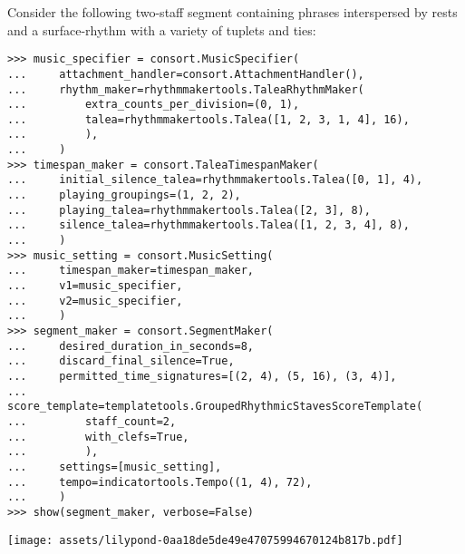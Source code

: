 Consider the following two-staff segment containing phrases interspersed by
rests and a surface-rhythm with a variety of tuplets and ties:

\begin{comment}
<abjad>[stylesheet=../consort.ily]
music_specifier = consort.MusicSpecifier(
    attachment_handler=consort.AttachmentHandler(),
    rhythm_maker=rhythmmakertools.TaleaRhythmMaker(
        extra_counts_per_division=(0, 1),
        talea=rhythmmakertools.Talea([1, 2, 3, 1, 4], 16),
        ),
    )
timespan_maker = consort.TaleaTimespanMaker(
    initial_silence_talea=rhythmmakertools.Talea([0, 1], 4),
    playing_groupings=(1, 2, 2),
    playing_talea=rhythmmakertools.Talea([2, 3], 8),
    silence_talea=rhythmmakertools.Talea([1, 2, 3, 4], 8),
    )
music_setting = consort.MusicSetting(
    timespan_maker=timespan_maker,
    v1=music_specifier,
    v2=music_specifier,
    )
segment_maker = consort.SegmentMaker(
    desired_duration_in_seconds=8,
    discard_final_silence=True,
    permitted_time_signatures=[(2, 4), (5, 16), (3, 4)],
    score_template=templatetools.GroupedRhythmicStavesScoreTemplate(
        staff_count=2,
        with_clefs=True,
        ),
    settings=[music_setting],
    tempo=indicatortools.Tempo((1, 4), 72),
    )
show(segment_maker, verbose=False)
</abjad>
\end{comment}

\begin{abjadbookoutput}
\begin{singlespacing}
\vspace{-0.5\baselineskip}
\begin{verbatim}
>>> music_specifier = consort.MusicSpecifier(
...     attachment_handler=consort.AttachmentHandler(),
...     rhythm_maker=rhythmmakertools.TaleaRhythmMaker(
...         extra_counts_per_division=(0, 1),
...         talea=rhythmmakertools.Talea([1, 2, 3, 1, 4], 16),
...         ),
...     )
>>> timespan_maker = consort.TaleaTimespanMaker(
...     initial_silence_talea=rhythmmakertools.Talea([0, 1], 4),
...     playing_groupings=(1, 2, 2),
...     playing_talea=rhythmmakertools.Talea([2, 3], 8),
...     silence_talea=rhythmmakertools.Talea([1, 2, 3, 4], 8),
...     )
>>> music_setting = consort.MusicSetting(
...     timespan_maker=timespan_maker,
...     v1=music_specifier,
...     v2=music_specifier,
...     )
>>> segment_maker = consort.SegmentMaker(
...     desired_duration_in_seconds=8,
...     discard_final_silence=True,
...     permitted_time_signatures=[(2, 4), (5, 16), (3, 4)],
...     score_template=templatetools.GroupedRhythmicStavesScoreTemplate(
...         staff_count=2,
...         with_clefs=True,
...         ),
...     settings=[music_setting],
...     tempo=indicatortools.Tempo((1, 4), 72),
...     )
>>> show(segment_maker, verbose=False)
\end{verbatim}
\noindent\texttt{[image: assets/lilypond-0aa18de5de49e47075994670124b817b.pdf]}
\end{singlespacing}
\end{abjadbookoutput}

